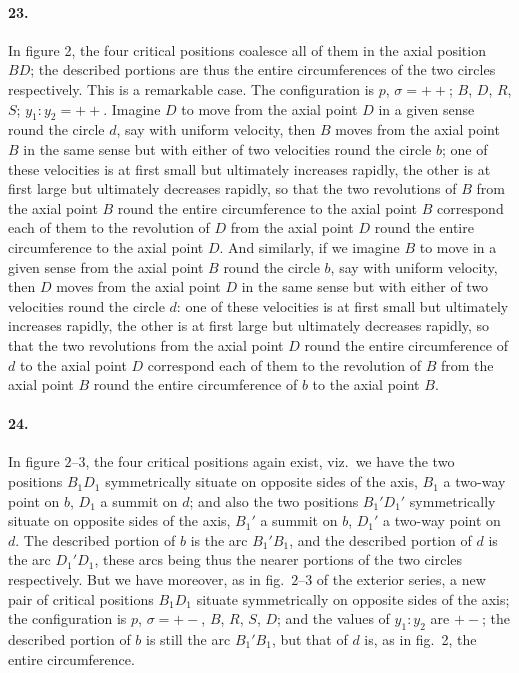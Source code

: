 \documentclass[11pt,a4paper]{article}
\theoremstyle{plain}
\begin{document}
\paragraph{23.} In figure 2, the four critical positions coalesce all of them in the axial position $BD$; the described portions are thus the entire circumferences of the two circles respectively. This is a remarkable case. The configuration is $p$, $\sigma = ++$; $B$, $D$, $R$, $S$; $y_1 : y_2 = ++$. Imagine $D$ to move from the axial point $D$ in a given sense round the circle $d$, say with uniform velocity, then $B$ moves from the axial point $B$ in the same sense but with either of two velocities round the circle $b$; one of these velocities is at first small but ultimately increases rapidly, the other is at first large but ultimately decreases rapidly, so that the two revolutions of $B$ from the axial point $B$ round the entire circumference to the axial point $B$ correspond each of them to the revolution of $D$ from the axial point $D$ round the entire circumference to the axial point $D$. And similarly, if we imagine $B$ to move in a given sense from the axial point $B$ round the circle $b$, say with uniform velocity, then $D$ moves from the axial point $D$ in the same sense but with either of two velocities round the circle $d$: one of these velocities is at first small but ultimately increases rapidly, the other is at first large but ultimately decreases rapidly, so that the two revolutions from the axial point $D$ round the entire circumference of $d$ to the axial point $D$ correspond each of them to the revolution of $B$ from the axial point $B$ round the entire circumference of $b$ to the axial point $B$.

\newpage

\paragraph{24.} In figure $2\text{--}3$, the four critical positions again exist, viz.~we have the two positions $B_1D_1$ symmetrically situate on opposite sides of the axis, $B_1$ a two-way point on $b$, $D_1$ a summit on $d$; and also the two positions $B_1'D_1'$ symmetrically situate on opposite sides of the axis, $B_1'$ a summit on $b$, $D_1'$ a two-way point on $d$. The described portion of $b$ is the arc $B_1'B_1$, and the described portion of $d$ is the arc $D_1'D_1$, these arcs being thus the nearer portions of the two circles respectively. But we have moreover, as in fig.~$2\text{--}3$ of the exterior series, a new pair of critical positions $B_1D_1$ situate symmetrically on opposite sides of the axis; the configuration is $p$, $\sigma = +-$, $B$, $R$, $S$, $D$; and the values of $y_1 : y_2$ are $+-$; the described portion of $b$ is still the arc $B_1'B_1$, but that of $d$ is, as in fig.~2, the entire circumference.
\end{document}
